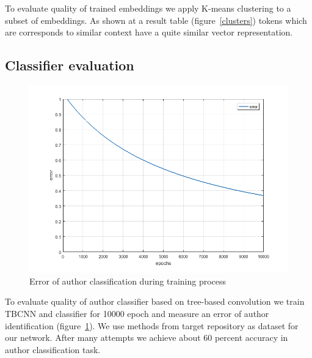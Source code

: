 \documentclass[11pt,technote]{IEEEtran}
\begin{document}
To evaluate quality of trained embeddings we apply K-means clustering to a subset of embeddings.
As shown at a result table (figure~\ref{clusters}) tokens which are corresponds to similar context have a 
quite similar vector representation.

\subsection{Classifier evaluation}
\begin{figure}
\includegraphics[scale=0.4]{test_err.png}
\caption{Error of author classification during training process}
\label{class_err}
\end{figure}

To evaluate quality of author classifier based on tree-based convolution we train TBCNN and classifier for 10000 epoch and measure an error of author identification (figure~\ref{class_err}). We use methods from target repository as dataset for our network. After many attempts we achieve about 60 percent accuracy  in author classification task.



\end{document}
